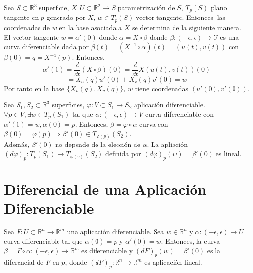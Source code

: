 \begin{ejm}
  Sea $S \subset \mathbb{R}^{3}$ superficie, $X : U \subset \mathbb{R}^{2} \to S$ parametrización de $S$, $T_{p}(S)$ plano tangente en $p$ generado por $X$, $w \in T_{p}(S)$ vector tangente. Entonces, las coordenadas de $w$ en la base asociada a $X$ se determina de la siguiente manera. \\

  El vector tangente $w = \alpha'(0)$ donde $\alpha = X \circ \beta$ donde $\beta : (-\epsilon, \epsilon) \to U$ es una curva diferenciable dada por $\beta(t) = (X^{-1} \circ \alpha) (t) = (u(t), v(t))$ con $\beta(0) = q = X^{-1}(p)$. Entonces,
  \[ 
    \alpha'(0) = \frac{d{}}{d{t}}(X \circ \beta)(0) = \frac{d{}}{d{t}}X(u(t), v(t))(0)
  \] 
  \[ 
    = X_{u}(q) u'(0) + X_{v}(q) v'(0) = w
  \] 
  Por tanto en la base $\{ X_{u}(q), X_{v}(q) \}$, $w$ tiene coordenadas $(u'(0), v'(0))$.
\end{ejm}

\begin{obs}
  Sea $S_{1}, S_{2} \subset \mathbb{R}^{3}$ superficies, $\varphi : V \subset S_{1} \to S_{2}$ aplicación diferenciable. $\forall p \in V, \exists w \in T_{p}(S_{1})$ tal que $\alpha : (-\epsilon, \epsilon) \to V$ curva diferenciable con $\alpha'(0) = w, \alpha(0) = p$. Entonces, $\beta = \varphi \circ \alpha$ curva con $\beta(0) = \varphi(p) \Rightarrow \beta'(0) \in T_{\varphi(p)}(S_{2})$.\\

  Además, $\beta'(0)$ no depende de la elección de $\alpha$. La apliación $(d \varphi)_{p} : T_{p}(S_{1}) \to T_{\varphi(p)}(S_{2})$ definida por $(d \varphi)_{p}(w) = \beta'(0)$ es lineal.
\end{obs}

\section{Diferencial de una Aplicación Diferenciable}

\begin{defn}[Diferencial]
  Sea $F : U \subset \mathbb{R}^{n} \to \mathbb{R}^{m}$ una aplicación diferenciable. Sea $w \in \mathbb{R}^{n}$ y $\alpha : (-\epsilon, \epsilon) \to U$ curva diferenciable tal que $\alpha(0) = p$ y $\alpha'(0) = w$. Entonces, la curva $\beta = F \circ \alpha : (-\epsilon, \epsilon) \to \mathbb{R}^{m}$ es diferenciable y $(dF)_{p}(w) = \beta'(0)$ es la diferencial de $F$ en $p$, donde $(d F)_{p} : \mathbb{R}^{n} \to \mathbb{R}^{m} $ es aplicación lineal.
\end{defn}

